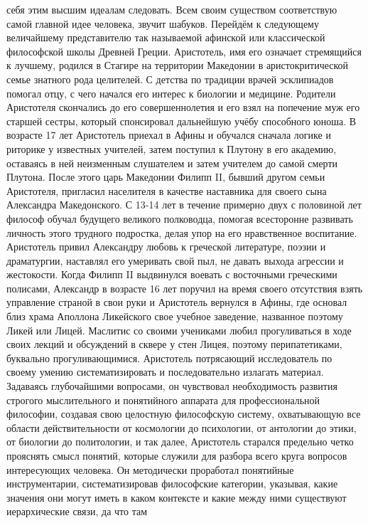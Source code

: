 себя этим высшим идеалам следовать. Всем своим существом соответствую самой
главной идее человека, звучит шабуков. Перейдём к следующему величайшему
представителю так называемой афинской или классической философской школы Древней
Греции. Аристотель, имя его означает стремящийся к лучшему, родился в Стагире на
территории Македонии в аристокритической семье знатного рода целителей. С
детства по традиции врачей эсклипиадов помогал отцу, с чего начался его интерес
к биологии и медицине. Родители Аристотеля скончались до его совершеннолетия и
его взял на попечение муж его старшей сестры, который спонсировал дальнейшую
учёбу способного юноша. В возрасте 17 лет Аристотель приехал в Афины и обучался
сначала логике и риторике у известных учителей, затем поступил к Плутону в его
академию, оставаясь в ней неизменным слушателем и затем учителем до самой смерти
Плутона. После этого царь Македонии Филипп II, бывший другом семьи Аристотеля,
пригласил населителя в качестве наставника для своего сына Александра
Македонского. С 13-14 лет в течение примерно двух с половиной лет философ обучал
будущего великого полководца, помогая всесторонне развивать личность этого
трудного подростка, делая упор на его нравственное воспитание. Аристотель привил
Александру любовь к греческой литературе, поэзии и драматургии, наставлял его
умеривать свой пыл, не давать выхода агрессии и жестокости. Когда Филипп II
выдвинулся воевать с восточными греческими полисами, Александр в возрасте 16 лет
поручил на время своего отсутствия взять управление страной в свои руки и
Аристотель вернулся в Афины, где основал близ храма Аполлона Ликейского свое
учебное заведение, названное поэтому Ликей или Лицей. Маслитис со своими
учениками любил прогуливаться в ходе своих лекций и обсуждений в сквере у стен
Лицея, поэтому перипатетиками, буквально прогуливающимися. Аристотель
потрясающий исследователь по своему умению систематизировать и последовательно
излагать материал. Задаваясь глубочайшими вопросами, он чувствовал необходимость
развития строгого мыслительного и понятийного аппарата для профессиональной
философии, создавая свою целостную философскую систему, охватывающую все области
действительности от космологии до психологии, от антологии до этики, от биологии
до политологии, и так далее, Аристотель старался предельно четко прояснять смысл
понятий, которые служили для разбора всего круга вопросов интересующих человека.
Он методически проработал понятийные инструментарии, систематизировав
философские категории, указывая, какие значения они могут иметь в каком
контексте и какие между ними существуют иерархические связи, да что там
